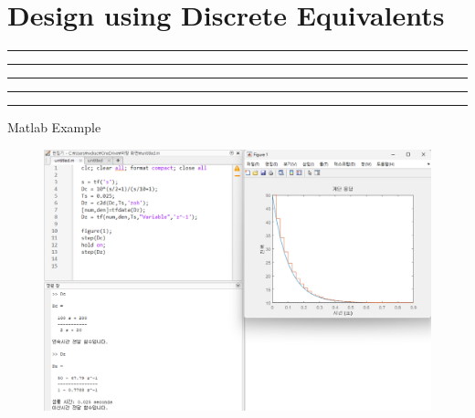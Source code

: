 \setcounter{chapter}{7}
\setcounter{section}{2}
\section{Design using Discrete Equivalents}
\vspace{-8pt} \hrule \hrule \hrule \hrule \hrule  \vspace{12pt}
Matlab Example
		\begin{figure}[h]
			\centering
			\includegraphics[width=20cm]{./FIG_Franklin/fig8-smc9.png}
		\end{figure}